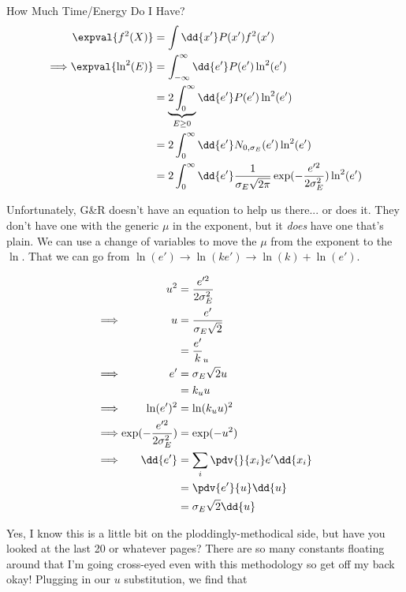 \begin{answer}
\begin{answerpart}{How Much Time/Energy Do I Have?}
    \begin{equation}
      \begin{alignedat}{2}
        &&\expval{f^2(X)} &= \int \dd{x'} P(x')f^2(x')
        \\
        \implies && \expval{\ln^2(E)}
        &=
        \int_{-\infty}^\infty \dd{e'}
        P(e')\ln^2(e')
        \\
        &&&=
        \underbrace{2\int_{0}^\infty}_{E \ge 0} \dd{e'}
        P(e')\ln^2(e')
        \\
        &&&=
        2\int_0^\infty \dd{e'}
        N_{0,\sigma_E}(e')\ln^2(e')
        \\
        &&&=
        2\int_0^\infty \dd{e'}
        \frac{1}{\sigma_E\sqrt{2\pi}}
        \exp(-\frac{e'^2}{2\sigma_E^2})
        \ln^2(e')
        \\
      \end{alignedat}
    \end{equation}

    Unfortunately, G\&R doesn't have an equation to help us
    there... or does it.  They don't have one with the generic $\mu$
    in the exponent, but it \emph{does} have one that's plain.  We can
    use a change of variables to move the $\mu$ from the exponent to
    the $\ln$.  That we can go from $\ln(e') \rightarrow \ln(ke')
    \rightarrow \ln(k) + \ln(e')$.

    \begin{equation}
      \begin{alignedat}{2}
        && u^2 &= \frac{e'^2}{2\sigma_E^2}\\
        \implies && u &= \frac{e'}{\sigma_E\sqrt{2}}\\
        &&&= \frac{e'}k_u\\
        \implies && e' &= \sigma_E\sqrt{2}u\\
        &&&= k_uu\\
        \implies && \ln(e')^2 &= \ln(k_uu)^2\\
        \implies && \exp(-\frac{e'^2}{2\sigma_E^2})
        &= \exp(-u^2)\\
        \implies && \dd{e'}
        &= \sum_i \pdv{}{x_i}e' \dd{x_i}\\
        &&&= \pdv{e'}{u}\dd{u}\\
        &&&= \sigma_E\sqrt{2}\dd{u}\\
      \end{alignedat}
    \end{equation}

    Yes,  I know  this is  a little  bit on  the ploddingly-methodical
    side, but have you looked at the last 20 or whatever pages?  There
    are so  many constants floating  around that I'm  going cross-eyed
    even with this  methodology so get off my back  okay!  Plugging in
    our $u$ substitution,  we find that
    

\end{answerpart}
\end{answer}
